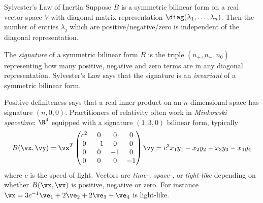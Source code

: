 \begin{thm}{Sylvester's Law of Inertia}{}
Suppose $B$ is a symmetric bilinear form on a real vector space $V$ with diagonal matrix representation $\diag(\lambda_1,\ldots,\lambda_n)$. Then the number of entries $\lambda_j$ which are positive/negative/zero is independent of the diagonal representation.
\end{thm}

\begin{defn}{}{}
The \emph{signature} of a symmetric bilinear form $B$ is the triple $(n_+,n_-,n_0)$ representing how many positive, negative and zero terms are in any diagonal representation. Sylvester's Law says that the signature is an \emph{invariant} of a symmetric bilinear form.
\end{defn}

Positive-definiteness says that a real inner product on an $n$-dimensional space has signature $(n,0,0)$. Practitioners of relativity often work in \emph{Minkowski spacetime}: $\R^4$ equipped with a signature $(1,3,0)$ bilinear form, typically
\[B(\vx,\vy)=\vx^T\begin{pmatrix}
c^2&0&0&0\\
0&-1&0&0\\
0&0&-1&0\\
0&0&0&-1
\end{pmatrix}\vy =c^2x_1y_1-x_2y_2-x_3y_3-x_4y_4\]
where $c$ is the speed of light. Vectors are \emph{time-, space-,} or \emph{light-like} depending on whether $B(\vx,\vx)$ is positive, negative or zero. For instance $\vx=3c^{-1}\ve_1+2\ve_2+2\ve_3+\ve_4$ is light-like.

